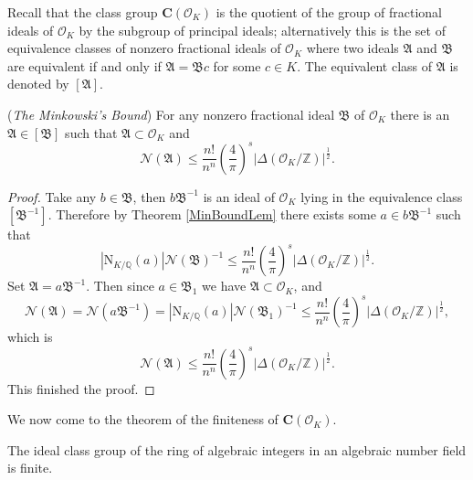 Recall that the class group $\mathbf{C}(\mathcal{O}_K)$ is the quotient of the group of fractional ideals of $\mathcal{O}_K$ by the subgroup of principal ideals; alternatively this is the set of equivalence classes of nonzero fractional ideals of $\mathcal{O}_K$ where two ideals $\mathfrak{A}$ and $\mathfrak{B}$ are equivalent if and only if $\mathfrak{A}=\mathfrak{B}c$ for some $c\in K$. The equivalent class of $\mathfrak{A}$ is denoted by $[\mathfrak{A}]$.
\begin{theorem}{(\textit{The Minkowski's Bound})}\label{MinBound}
For any nonzero fractional ideal $\mathfrak{B}$ of $\mathcal{O}_K$ there is an $\mathfrak{A}\in[\mathfrak{B}]$ such that $\mathfrak{A}\subset\mathcal{O}_K$ and 
$$
\mathcal{N} \left( \mathfrak{A} \right) \le \frac{n!}{n^n}\left( \frac{4}{\pi} \right) ^s\left| \Delta \left( \mathcal{O} _K/\mathbb{Z} \right) \right|^{\frac{1}{2}}.
$$
\end{theorem}
\begin{proof}
Take any $b\in\mathfrak{B}$, then $b\mathfrak{B}^{-1}$ is an ideal of $\mathcal{O}_K$ lying in the equivalence class $[\mathfrak{B}^{-1}]$. Therefore by Theorem \ref{MinBoundLem} there exists some $a\in b\mathfrak{B}^{-1}$ such that 
$$
\left| \mathrm{N}_{K/\mathbb{Q}}\left( a \right) \right|\mathcal{N} \left( \mathfrak{B} \right) ^{-1}\le \frac{n!}{n^n}\left( \frac{4}{\pi} \right) ^s\left| \Delta \left( \mathcal{O} _K/\mathbb{Z} \right) \right|^{\frac{1}{2}}.
$$
Set $\mathfrak{A}=a\mathfrak{B}^{-1}$. Then since $a\in\mathfrak{B}_1$ we have $\mathfrak{A}\subset\mathcal{O}_K$, and 
$$
\mathcal{N} \left( \mathfrak{A} \right) =\mathcal{N} \left( a\mathfrak{B} ^{-1} \right) =\left| \mathrm{N}_{K/\mathbb{Q}}\left( a \right) \right|\mathcal{N} \left( \mathfrak{B} _1 \right) ^{-1}\le \frac{n!}{n^n}\left( \frac{4}{\pi} \right) ^s\left| \Delta \left( \mathcal{O} _K/\mathbb{Z} \right) \right|^{\frac{1}{2}},
$$
which is 
$$
\mathcal{N} \left( \mathfrak{A} \right) \le \frac{n!}{n^n}\left( \frac{4}{\pi} \right) ^s\left| \Delta \left( \mathcal{O} _K/\mathbb{Z} \right) \right|^{\frac{1}{2}}.
$$
This finished the proof.
\end{proof}
We now come to the theorem of the finiteness of $\mathbf{C}(\mathcal{O}_K)$.
\begin{theorem}
The ideal class group of the ring of algebraic integers in an algebraic number field is finite.
\end{theorem}

